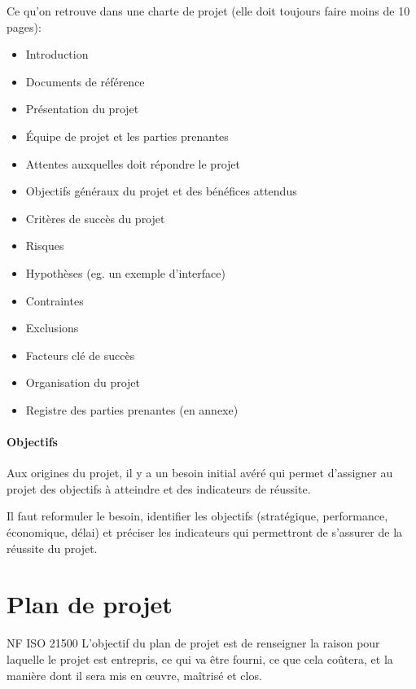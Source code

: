 \documentclass[10pt,a4paper,french]{article}
\begin{document}
Ce qu'on retrouve dans une charte de projet (elle doit toujours faire moins de 10 pages):
\begin{itemize}
\item Introduction
\item Documents de référence
\item Présentation du projet
\item Équipe de projet et les parties prenantes
\item Attentes auxquelles doit répondre le projet
\item Objectifs généraux du projet et des bénéfices attendus
\item Critères de succès du projet
\item Risques
\item Hypothèses (eg. un exemple d'interface)
\item Contraintes
\item Exclusions
\item Facteurs clé de succès
\item Organisation du projet
\item Registre des parties prenantes (en annexe)
\end{itemize}

\subsection{Objectifs}

\begin{cquote}{}
Aux origines du projet, il y a un besoin initial avéré qui permet d'assigner au projet des objectifs à atteindre et des indicateurs de réussite.
\end{cquote}

Il faut reformuler le besoin, identifier les objectifs (stratégique, performance, économique, délai) et préciser les indicateurs qui permettront de s'assurer de la réussite du projet.

\part{Plan de projet}

\begin{cquote}{NF ISO 21500}
L'objectif du plan de projet est de renseigner la raison pour laquelle le projet est entrepris, ce qui va être fourni, ce que cela coûtera, et la manière dont il sera mis en œuvre, maîtrisé et clos.
\end{cquote}
\end{document}
